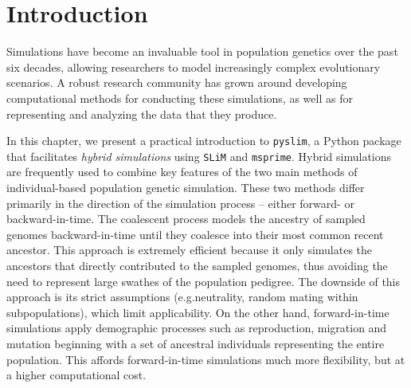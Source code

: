 \documentclass[12pt]{article}
\newcommand{\msprime}[0]{\texttt{msprime}\xspace}
\newcommand{\slim}[0]{\texttt{SLiM}\xspace}
\newcommand{\pyslim}[0]{\texttt{pyslim}\xspace}
\newcommand*{\eg}{e.g.\xcomma}
\begin{document}
\section{Introduction}
Simulations have become an invaluable tool in population genetics over the past six decades,
allowing researchers to model increasingly complex evolutionary scenarios.
A robust research community has grown around developing computational methods for conducting these
simulations, as well as for representing and analyzing the data that they produce.

In this chapter, we present a practical introduction to \pyslim, a Python package that facilitates \emph{hybrid simulations}
using \slim and \msprime.
Hybrid simulations are frequently used to combine key features of the two main methods of individual-based population genetic simulation.
These two methods differ primarily in the direction of the simulation
process -- either forward- or backward-in-time. 
The coalescent process models the ancestry of sampled genomes
backward-in-time until they coalesce into their most common recent ancestor. %
This approach is extremely efficient because it only simulates the ancestors that directly contributed to the sampled genomes,
thus avoiding the need to represent large swathes of the population pedigree. 
The downside of this approach is its strict assumptions (\eg neutrality, random mating within subpopulations), 
which limit applicability.
On the other hand, forward-in-time simulations apply demographic processes
such as reproduction, migration and mutation
beginning with a set of ancestral individuals representing the entire population.
This affords forward-in-time simulations much more flexibility,
but at a higher computational cost.
\end{document}
